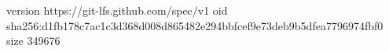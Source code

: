 version https://git-lfs.github.com/spec/v1
oid sha256:d1fb178c7ac1c3d368d008d865482e294bbfcef9e73deb9b5dfea7796974fbf0
size 349676
